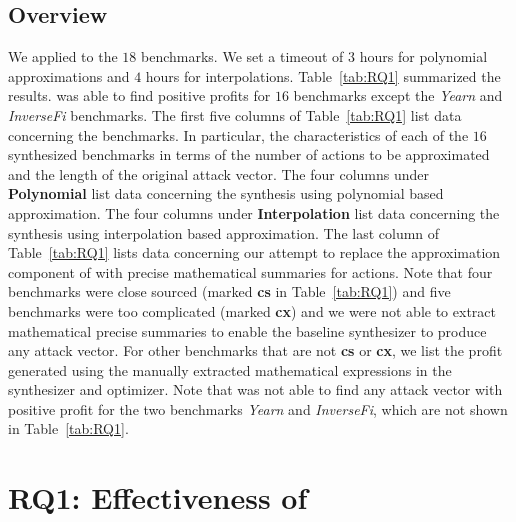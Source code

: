 \subsection{Overview}

We applied {\name} to the $18$ benchmarks. We set a timeout of $3$ hours for
polynomial approximations and $4$ hours for interpolations. Table~\ref{tab:RQ1}
summarized the results. {\name} was able to find positive profits for $16$
benchmarks except the \emph{Yearn} and \emph{InverseFi} benchmarks. The first
five columns of Table~\ref{tab:RQ1} list data concerning the benchmarks. In
particular, the characteristics of each of the $16$ synthesized benchmarks in terms of the number of
actions to be approximated and the length of the original attack vector. The
four columns under \textbf{Polynomial} list data concerning the synthesis using
polynomial based approximation. The four columns under \textbf{Interpolation}
list data concerning the synthesis using interpolation based approximation. The
last column of Table~\ref{tab:RQ1} lists data concerning our attempt to replace
the approximation component of {\name} with precise mathematical summaries
for actions. 
Note that four benchmarks were close sourced (marked \textbf{cs} in
Table~\ref{tab:RQ1}) and five benchmarks were too complicated (marked
\textbf{cx}) and we were not able to extract mathematical precise summaries to enable
the baseline synthesizer to produce any attack vector. For other benchmarks that
are not \textbf{cs} or \textbf{cx}, we list the profit generated using the manually extracted
mathematical expressions in the synthesizer and optimizer. Note that {\name} was
not able to find any attack vector with positive profit for the two benchmarks
\emph{Yearn} and \emph{InverseFi}, which are not shown in Table~\ref{tab:RQ1}.




\section{RQ1: Effectiveness of {\name}}

